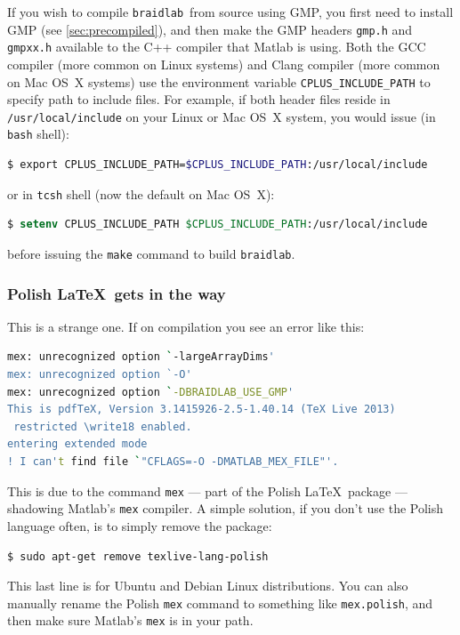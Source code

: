 \documentclass[12pt]{article}
\newcommand{\braidlab}{\texttt{braidlab}}%
\begin{document}
If you wish to compile \braidlab\ from source using GMP, you first need to
install GMP (see \ref{sec:precompiled}), and then make the GMP headers
\lstinline{gmp.h} and \lstinline{gmpxx.h} available to the C++ compiler that
Matlab is using. Both the %
%
GCC compiler (more common on Linux %
%
systems) and %
%
%
Clang compiler (more common on Mac OS~X systems) %
%
use the environment variable \lstinline{CPLUS_INCLUDE_PATH} to specify path to
include files. For example, if both header files reside in
\lstinline{/usr/local/include} on your Linux or Mac OS~X system, you would
issue (in \lstinline{bash} shell):
\begin{lstlisting}[frame=single,framerule=0pt,escapechar=*,%
  language=bash,backgroundcolor=\color{white}]
$ export CPLUS_INCLUDE_PATH=$CPLUS_INCLUDE_PATH:/usr/local/include
\end{lstlisting}
or in \lstinline{tcsh} shell (now the default on Mac OS~X):
\begin{lstlisting}[frame=single,framerule=0pt,escapechar=*,%
  language=csh,backgroundcolor=\color{white}]
$ setenv CPLUS_INCLUDE_PATH $CPLUS_INCLUDE_PATH:/usr/local/include
\end{lstlisting}
before issuing the \lstinline{make} command to build \lstinline{braidlab}.

%


\subsubsection{Polish \LaTeX\ gets in the way}

%
This is a strange one.  If on compilation you see an error like this:
\begin{lstlisting}[frame=single,framerule=0pt,escapechar=*,%
  language=bash,backgroundcolor=\color{white}]
mex: unrecognized option `-largeArrayDims'
mex: unrecognized option `-O'
mex: unrecognized option `-DBRAIDLAB_USE_GMP'
This is pdfTeX, Version 3.1415926-2.5-1.40.14 (TeX Live 2013)
 restricted \write18 enabled.
entering extended mode
! I can't find file `"CFLAGS=-O -DMATLAB_MEX_FILE"'.
\end{lstlisting}
This is due to the command \lstinline{mex} --- part of the Polish \LaTeX\
package --- shadowing Matlab's \lstinline{mex} compiler.  A simple solution,
if you don't use the Polish language often, is to simply remove the package:
\begin{lstlisting}[frame=single,framerule=0pt,escapechar=*,%
  language=bash,backgroundcolor=\color{white}]
$ sudo apt-get remove texlive-lang-polish
\end{lstlisting}
This last line is for Ubuntu and Debian Linux distributions.  You can also
manually rename the Polish \lstinline{mex} command to something like
\lstinline{mex.polish}, and then make sure Matlab's \lstinline{mex} is in your
path.
\end{document}

